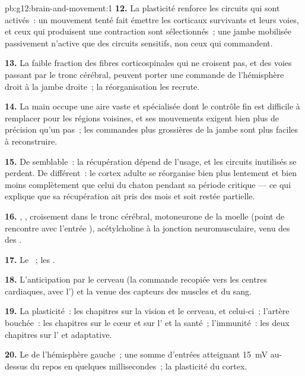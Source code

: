 \begin{solution}{pb:g12:brain-and-movement:1}
\textbf{12.} La plasticité renforce les circuits qui sont activés~:
un mouvement tenté fait émettre les  corticaux survivants et
leurs voies, et ceux qui produisent une contraction sont
sélectionnés~; une jambe mobilisée passivement n'active que des
circuits sensitifs, non ceux qui commandent.

\textbf{13.} La faible fraction des fibres corticospinales qui ne
croisent pas, et des voies passant par le tronc cérébral, peuvent
porter une commande de l'hémisphère droit à la jambe droite~; la
réorganisation les recrute.

\textbf{14.} La main occupe une aire vaste et spécialisée dont le
contrôle fin est difficile à remplacer pour les régions voisines, et
ses mouvements exigent bien plus de précision qu'un pas~; les
commandes plus grossières de la jambe sont plus faciles à
reconstruire.

\textbf{15.} De semblable~: la récupération dépend de l'usage, et les
circuits inutilisés se perdent. De différent~: le cortex adulte se
réorganise bien plus lentement et bien moins complètement que celui du
chaton pendant sa période critique --- ce qui explique que sa
récupération ait pris des mois et soit restée partielle.

\textbf{16.} , , croisement dans le
tronc cérébral, motoneurone de la moelle (point de rencontre avec
l'entrée ), acétylcholine à la jonction neuromusculaire, 
venu des  des .

\textbf{17.} Le ~; les .

\textbf{18.} L'anticipation par le cerveau (la commande recopiée vers
les centres cardiaques, avec l') et la  venue des
capteurs des muscles et du sang.

\textbf{19.} La plasticité~: les chapitres sur la vision et le cerveau,
et celui-ci~; l'artère bouchée~: les chapitres sur le cœur et sur
l' et la santé~; l'immunité~: les deux chapitres sur
l' et adaptative.

\textbf{20.} Le  de l'hémisphère gauche~; une
somme d'entrées atteignant \qty{15}{mV} au-dessus du repos en quelques
millisecondes~; la plasticité du cortex.
\end{solution}
